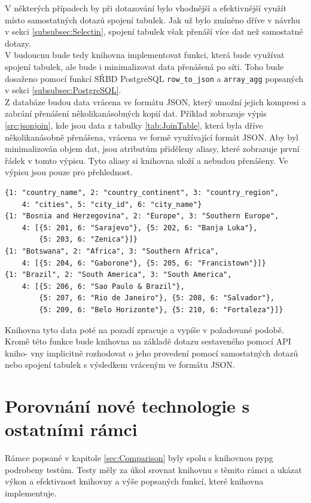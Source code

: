 \documentclass[ing,male,java,dept456]{diploma}						%
\begin{document}
V některých případech by při dotazování bylo vhodnější a efektivnější využít místo samostatných dotazů spojení tabulek. Jak už bylo zmíněno dříve v návrhu v sekci \ref{subsubsec:Selectin}, spojení tabulek však přenáší více dat než samostatné dotazy. \\ 
V budoucnu bude tedy knihovna implementovat funkci, která bude využívat spojení tabulek, ale bude i minimalizovat data přenášená po síti. Toho bude dosaženo pomocí funkcí SŘBD PostgreSQL \lstinline[style=inlinepython]|row_to_json| a \lstinline[style=inlinepython]|array_agg| popsaných v sekci \ref{subsubsec:PostgreSQL}. \\
Z databáze budou data vrácena ve formátu JSON, který umožní jejich kompresi a zabrání přenášení několikanásobných kopií dat. Příklad zobrazuje výpis \ref{src:jsonjoin}, kde jsou data z tabulky \ref{tab:JoinTable}, která byla dříve několikanásobně přenášena, vrácena ve formě využívající formát JSON. Aby byl minimalizován objem dat, jsou atributům přiděleny aliasy, které zobrazuje první řádek v tomto výpisu. Tyto aliasy si knihovna uloží a nebudou přenášeny. Ve výpisu jsou pouze pro přehlednost. \\
\begin{lstlisting}[style=custompython, label=src:jsonjoin, caption={Minimalizace přenášených dat z tabulky \ref{tab:JoinTable} pomocí formátu JSON}]
{1: "country_name", 2: "country_continent", 3: "country_region", 
	4: "cities", 5: "city_id", 6: "city_name"}
{1: "Bosnia and Herzegovina", 2: "Europe", 3: "Southern Europe", 
	4: [{5: 201, 6: "Sarajevo"}, {5: 202, 6: "Banja Luka"}, 
		{5: 203, 6: "Zenica"}]}
{1: "Botswana", 2: "Africa", 3: "Southern Africa", 
	4: [{5: 204, 6: "Gaborone"}, {5: 205, 6: "Francistown"}]}
{1: "Brazil", 2: "South America", 3: "South America", 
	4: [{5: 206, 6: "Sao Paulo & Brazil"}, 
		{5: 207, 6: "Rio de Janeiro"}, {5: 208, 6: "Salvador"}, 
		{5: 209, 6: "Belo Horizonte"}, {5: 210, 6: "Fortaleza"}]}
\end{lstlisting}

Knihovna tyto data poté na pozadí zpracuje a vypíše v požadované podobě. \\
Kromě této funkce bude knihovna na základě dotazu sestaveného pomocí API kniho- vny implicitně rozhodovat o jeho provedení pomocí samostatných dotazů nebo spojení tabulek s výsledkem vráceným ve formátu JSON.

\section{Porovnání nové technologie s ostatními rámci}
\label{sec:Bench}
Rámce popsané v kapitole \ref{sec:Comparison} byly spolu s knihovnou pypg podrobeny testům. Testy měly za úkol srovnat knihovnu s těmito rámci a ukázat výkon a efektivnost knihovny a výše popsaných funkcí, které knihovna implementuje.
\end{document}
